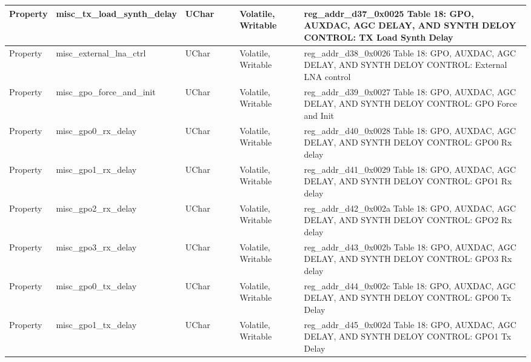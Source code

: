 \documentclass{article}
\begin{document}
\begin{scriptsize}
\begin{longtable}{|p{2cm}|p{5cm}|p{1cm}|p{2cm}|p{2cm}|p{1.75cm}|p{1.5cm}|p{5.1cm}|}
  \hline
  Property & misc\_tx\_load\_synth\_delay                             & UChar &                  &                  & Volatile,  Writable &         & reg\_addr\_d37\_0x0025  Table 18: GPO, AUXDAC, AGC DELAY, AND SYNTH DELOY CONTROL: TX Load Synth Delay \\
  \hline
  Property & misc\_external\_lna\_ctrl                                & UChar &                  &                  & Volatile,  Writable &         & reg\_addr\_d38\_0x0026  Table 18: GPO, AUXDAC, AGC DELAY, AND SYNTH DELOY CONTROL: External LNA control \\
  \hline
  Property & misc\_gpo\_force\_and\_init                              & UChar &                  &                  & Volatile,  Writable &         & reg\_addr\_d39\_0x0027  Table 18: GPO, AUXDAC, AGC DELAY, AND SYNTH DELOY CONTROL: GPO Force and Init \\
  \hline
  Property & misc\_gpo0\_rx\_delay                                    & UChar &                  &                  & Volatile,  Writable &         & reg\_addr\_d40\_0x0028  Table 18: GPO, AUXDAC, AGC DELAY, AND SYNTH DELOY CONTROL: GPO0 Rx delay \\
  \hline
  Property & misc\_gpo1\_rx\_delay                                    & UChar &                  &                  & Volatile,  Writable &         & reg\_addr\_d41\_0x0029  Table 18: GPO, AUXDAC, AGC DELAY, AND SYNTH DELOY CONTROL: GPO1 Rx delay \\
  \hline
  Property & misc\_gpo2\_rx\_delay                                    & UChar &                  &                  & Volatile,  Writable &         & reg\_addr\_d42\_0x002a  Table 18: GPO, AUXDAC, AGC DELAY, AND SYNTH DELOY CONTROL: GPO2 Rx delay \\
  \hline
  Property & misc\_gpo3\_rx\_delay                                    & UChar &                  &                  & Volatile,  Writable &         & reg\_addr\_d43\_0x002b  Table 18: GPO, AUXDAC, AGC DELAY, AND SYNTH DELOY CONTROL: GPO3 Rx delay \\
  \hline
  Property & misc\_gpo0\_tx\_delay                                    & UChar &                  &                  & Volatile,  Writable &         & reg\_addr\_d44\_0x002c  Table 18: GPO, AUXDAC, AGC DELAY, AND SYNTH DELOY CONTROL: GPO0 Tx Delay \\
  \hline
  Property & misc\_gpo1\_tx\_delay                                    & UChar &                  &                  & Volatile,  Writable &         & reg\_addr\_d45\_0x002d  Table 18: GPO, AUXDAC, AGC DELAY, AND SYNTH DELOY CONTROL: GPO1 Tx Delay \\

\end{longtable}
\end{scriptsize}
\end{document}
